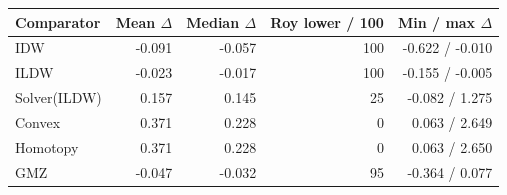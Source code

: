 \begin{tabular}{lrrrr}\toprule
Comparator & Mean $\Delta$ & Median $\Delta$ & Roy lower / 100 & Min / max $\Delta$ \\ \midrule
IDW & -0.091 & -0.057 & 100 & -0.622 / -0.010 \\
ILDW & -0.023 & -0.017 & 100 & -0.155 / -0.005 \\
Solver(ILDW) & 0.157 & 0.145 & 25 & -0.082 / 1.275 \\
Convex & 0.371 & 0.228 & 0 & 0.063 / 2.649 \\
Homotopy & 0.371 & 0.228 & 0 & 0.063 / 2.650 \\
GMZ & -0.047 & -0.032 & 95 & -0.364 / 0.077 \\
\bottomrule\end{tabular}
